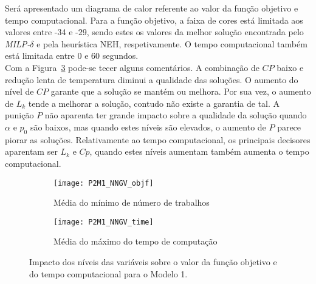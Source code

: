 Será apresentado um diagrama de calor referente ao valor da função objetivo e tempo computacional. Para a função objetivo, a faixa de cores está limitada aos valores entre -34 e -29, sendo estes os valores da melhor solução encontrada pelo \textit{MILP-$\delta$} e pela heurística NEH, respetivamente. O tempo computacional também está limitada entre 0 e 60 segundos.\\

Com a Figura~\ref{fig:P2M1_NNGV} pode-se tecer alguns comentários. A combinação de $CP$ baixo e redução lenta de temperatura diminui a qualidade das soluções. O aumento do nível de $CP$ garante que a solução se mantém ou melhora. Por sua vez, o aumento de $L_{k}$ tende a melhorar a solução, contudo não existe a garantia de tal. A punição $P$ não aparenta ter grande impacto sobre a qualidade da solução quando $\alpha$ e $p_{0}$ são baixos, mas quando estes níveis são elevados, o aumento de $P$ parece piorar as soluções. Relativamente ao tempo computacional, os principais decisores aparentam ser $L_{k}$ e $Cp$, quando estes níveis aumentam também aumenta o tempo computacional.\\
\begin{figure}[H]
	\centering
	\begin{subfigure}{0.49\textwidth}
	\centering
		\texttt{[image: P2M1\_NNGV\_objf]}
		\caption{Média do mínimo de número de trabalhos}
		\label{fig:P2M1_NNGV_objf}
	\end{subfigure}
	\begin{subfigure}{0.49\textwidth}
	\centering
		\texttt{[image: P2M1\_NNGV\_time]}
		\caption{Média do máximo do tempo de computação}
		\label{fig:P2M1_NNGV_time}
	\end{subfigure}
	\caption{Impacto dos níveis das variáveis sobre o valor da função objetivo e do tempo computacional para o Modelo 1.}
	\label{fig:P2M1_NNGV}
\end{figure}

